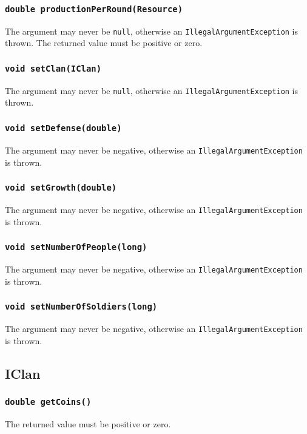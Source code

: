 \documentclass{article}
\begin{document}
\subsubsection{\texttt{double productionPerRound(Resource)}}
The argument may never be \texttt{null}, otherwise an \texttt{IllegalArgumentException} is thrown.
The returned value must be positive or zero.

\subsubsection{\texttt{void setClan(IClan)}}
The argument may never be \texttt{null}, otherwise an \texttt{IllegalArgumentException} is thrown.

\subsubsection{\texttt{void setDefense(double)}}
The argument may never be negative, otherwise an \texttt{IllegalArgumentException} is thrown.

\subsubsection{\texttt{void setGrowth(double)}}
The argument may never be negative, otherwise an \texttt{IllegalArgumentException} is thrown.

\subsubsection{\texttt{void setNumberOfPeople(long)}}
The argument may never be negative, otherwise an \texttt{IllegalArgumentException} is thrown.

\subsubsection{\texttt{void setNumberOfSoldiers(long)}}
The argument may never be negative, otherwise an \texttt{IllegalArgumentException} is thrown.

\subsection{IClan}

\subsubsection{\texttt{double getCoins()}}
The returned value must be positive or zero.
\end{document}
